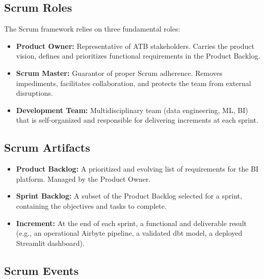 \subsection{Scrum Roles}

The Scrum framework relies on three fundamental roles:

\begin{itemize}
    \item \textbf{Product Owner:} Representative of ATB stakeholders. Carries the product
    vision, defines and prioritizes functional requirements in the Product Backlog.

    \item \textbf{Scrum Master:} Guarantor of proper Scrum adherence. Removes impediments,
    facilitates collaboration, and protects the team from external disruptions.

    \item \textbf{Development Team:} Multidisciplinary team (data engineering, ML, BI) that
    is self-organized and responsible for delivering increments at each sprint.
\end{itemize}

\subsection{Scrum Artifacts}

\begin{itemize}
    \item \textbf{Product Backlog:} A prioritized and evolving list of requirements for the
    BI platform. Managed by the Product Owner.

    \item \textbf{Sprint Backlog:} A subset of the Product Backlog selected for a sprint,
    containing the objectives and tasks to complete.

    \item \textbf{Increment:} At the end of each sprint, a functional and deliverable result
    (e.g., an operational Airbyte pipeline, a validated dbt model, a deployed Streamlit
    dashboard).
\end{itemize}

\subsection{Scrum Events}

